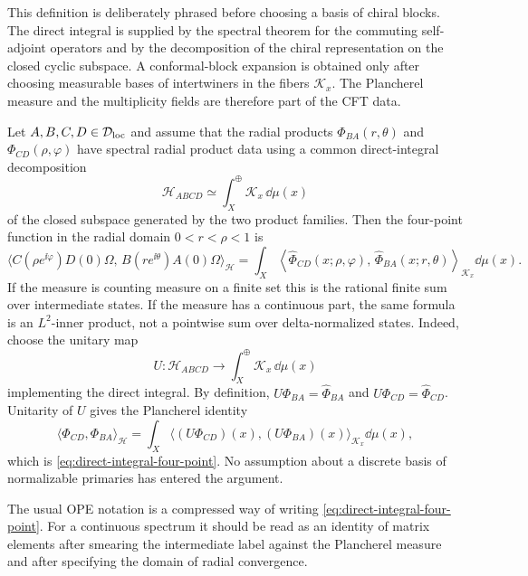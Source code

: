 This definition is deliberately phrased before choosing a basis of chiral
blocks.  The direct integral is supplied by the spectral theorem for the
commuting self-adjoint operators and by the decomposition of the chiral
representation on the closed cyclic subspace.  A conformal-block expansion is
obtained only after choosing measurable bases of intertwiners in the fibers
\(\mathcal K_x\).  The Plancherel measure and the multiplicity fields are
therefore part of the CFT data.

\begin{remark}
\label{rem:direct-integral-ope-identity}
Let \(A,B,C,D\in\mathcal D_{\rm loc}\) and assume that the radial products
\(\Phi_{BA}(r,\theta)\) and \(\Phi_{CD}(\rho,\varphi)\) have spectral radial
product data using a common direct-integral decomposition
\[
  \mathcal H_{ABCD}
  \simeq
  \int_X^{\oplus}\mathcal K_x\,\dd\mu(x)
\]
of the closed subspace generated by the two product families.  Then the
four-point function in the radial domain \(0<r<\rho<1\) is
\begin{equation}
  \langle
    C(\rho e^{\ii\varphi})D(0)\Omega,\,
    B(re^{\ii\theta})A(0)\Omega
  \rangle_{\mathcal H}
  =
  \int_X
  \left\langle
    \widehat\Phi_{CD}(x;\rho,\varphi),\,
    \widehat\Phi_{BA}(x;r,\theta)
  \right\rangle_{\mathcal K_x}
  \dd\mu(x).
  \label{eq:direct-integral-four-point}
\end{equation}
If the measure is counting measure on a finite set this is the rational
finite sum over intermediate states.  If the measure has a continuous part,
the same formula is an \(L^2\)-inner product, not a pointwise sum over
delta-normalized states.
Indeed, choose the unitary map
\[
  U:\mathcal H_{ABCD}\longrightarrow
  \int_X^{\oplus}\mathcal K_x\,\dd\mu(x)
\]
implementing the direct integral.  By definition,
\(U\Phi_{BA}=\widehat\Phi_{BA}\) and
\(U\Phi_{CD}=\widehat\Phi_{CD}\).  Unitarity of \(U\) gives the Plancherel
identity
\[
  \langle \Phi_{CD},\Phi_{BA}\rangle_{\mathcal H}
  =
  \int_X
    \langle
      (U\Phi_{CD})(x),(U\Phi_{BA})(x)
    \rangle_{\mathcal K_x}\dd\mu(x),
\]
which is \eqref{eq:direct-integral-four-point}.  No assumption about a
discrete basis of normalizable primaries has entered the argument.
\end{remark}

The usual OPE notation is a compressed way of writing
\eqref{eq:direct-integral-four-point}.  For a continuous spectrum it should
be read as an identity of matrix elements after smearing the intermediate
label against the Plancherel measure and after specifying the domain of
radial convergence.

